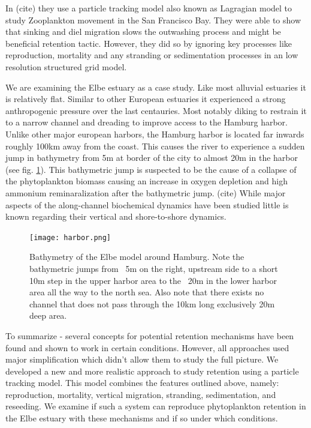 In (cite) they use a particle tracking model also known as Lagragian model to study Zooplankton movement in the San Francisco Bay.
They were able to show  that sinking and diel migration slows the outwashing process and might be beneficial retention tactic.
However, they did so by ignoring key processes like reproduction, mortality and any stranding or sedimentation processes in an low resolution structured grid model.

We are examining the Elbe estuary as a case study.
Like most alluvial estuaries it is relatively flat.
Similar to other European estuaries it experienced a strong anthropogenic pressure over the last centauries.
Most notably diking to restrain it to a narrow channel and dreading to improve access to the Hamburg harbor.
Unlike other major european harbors, the Hamburg harbor is located far inwards roughly 100km away from the coast.
This causes the river to experience a sudden jump in bathymetry from 5m at border of the city to almost 20m in the harbor (see fig. \ref{fig:bathymetry}). 
This bathymetric jump is suspected to be the cause of a collapse of the phytoplankton biomass causing an increase in oxygen depletion and high ammonium reminaralization after the bathymetric jump. (cite)
While major aspects of the along-channel biochemical dynamics have been studied little is known regarding their vertical and shore-to-shore dynamics.

\begin{figure}
    \texttt{[image: harbor.png]}
    \caption{Bathymetry of the Elbe model around Hamburg. Note the bathymetric jumps from ~5m on the right, upstream side to a short 10m step in the upper harbor area to the ~20m in the lower harbor area all the way to the north sea. Also note that there exists no channel that does not pass through the 10km long exclusively 20m deep area. }
    \label{fig:bathymetry}
\end{figure}

To summarize - several concepts for potential retention mechanisms have been found
 and shown to work in certain conditions.
However, all approaches used major simplification which didn't allow them to study the full picture.
We developed a new and more realistic approach to study retention using a particle tracking model.
This model combines the features outlined above, namely: reproduction, mortality, vertical migration, stranding, sedimentation, and reseeding.
We examine if such a system can reproduce phytoplankton retention in the Elbe estuary with these mechanisms and if so under which conditions.




